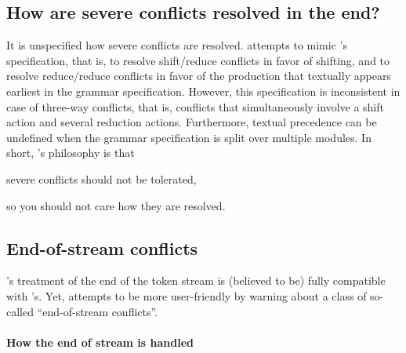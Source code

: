 \documentclass[onecolumn,11pt,nocopyrightspace,preprint]{sigplanconf}
\begin{document}
\subsection{How are severe conflicts resolved in the end?}
\label{sec:conflicts:severe:resolution}

It is unspecified how severe conflicts are resolved. \menhir attempts to mimic
\ocamlyacc's specification, that is, to resolve shift/reduce conflicts in favor
of shifting, and to resolve reduce/reduce conflicts in favor of the production
that textually appears earliest in the grammar specification. However, this
specification is inconsistent in case of three-way conflicts, that is,
conflicts that simultaneously involve a shift action and several reduction
actions. Furthermore, textual precedence can be undefined when the grammar
specification is split over multiple modules. In short, \menhir's philosophy is
that
\begin{center}
severe conflicts should not be tolerated,
\end{center}
so you should not care how they are resolved.


\subsection{End-of-stream conflicts}
\label{sec:eos}

\menhir's treatment of the end of the token stream is (believed to be) fully compatible
with \ocamlyacc's. Yet, \menhir attempts to be more user-friendly by warning
about a class of so-called ``end-of-stream conflicts''.


\paragraph{How the end of stream is handled}
\end{document}
